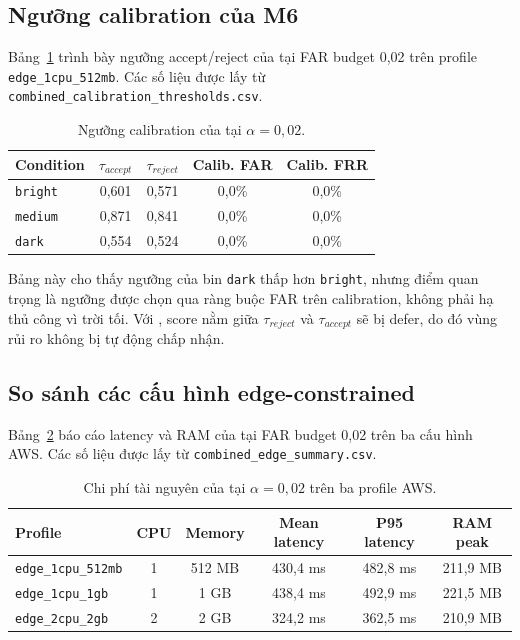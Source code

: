 \subsection{Ngưỡng calibration của M6}

Bảng~\ref{tab:thresholds} trình bày ngưỡng accept/reject của  tại FAR budget 0,02 trên profile \texttt{edge\_1cpu\_512mb}. Các số liệu được lấy từ \texttt{combined\_calibration\_thresholds.csv}.

\begin{table}[!htbp]
\centering
\caption{Ngưỡng calibration của  tại $\alpha=0{,}02$.}
\label{tab:thresholds}
\begin{tabular}{lcccc}
\toprule
\textbf{Condition} & \textbf{$\tau_{accept}$} & \textbf{$\tau_{reject}$} & \textbf{Calib. FAR} & \textbf{Calib. FRR} \\
\midrule
\texttt{bright} & 0,601 & 0,571 & 0,0\% & 0,0\% \\
\texttt{medium} & 0,871 & 0,841 & 0,0\% & 0,0\% \\
\texttt{dark} & 0,554 & 0,524 & 0,0\% & 0,0\% \\
\bottomrule
\end{tabular}
\end{table}

Bảng này cho thấy ngưỡng của bin \texttt{dark} thấp hơn \texttt{bright}, nhưng điểm quan trọng là ngưỡng được chọn qua ràng buộc FAR trên calibration, không phải hạ thủ công vì trời tối. Với , score nằm giữa $\tau_{reject}$ và $\tau_{accept}$ sẽ bị defer, do đó vùng rủi ro không bị tự động chấp nhận.

\subsection{So sánh các cấu hình edge-constrained}

Bảng~\ref{tab:profile_results} báo cáo latency và RAM của  tại FAR budget 0,02 trên ba cấu hình AWS. Các số liệu được lấy từ \texttt{combined\_edge\_summary.csv}.

\begin{table}[!htbp]
\centering
\caption{Chi phí tài nguyên của  tại $\alpha=0{,}02$ trên ba profile AWS.}
\label{tab:profile_results}
\begin{tabular}{lccccc}
\toprule
\textbf{Profile} & \textbf{CPU} & \textbf{Memory} & \textbf{Mean latency} & \textbf{P95 latency} & \textbf{RAM peak} \\
\midrule
\texttt{edge\_1cpu\_512mb} & 1 & 512 MB & 430,4 ms & 482,8 ms & 211,9 MB \\
\texttt{edge\_1cpu\_1gb}   & 1 & 1 GB   & 438,4 ms & 492,9 ms & 221,5 MB \\
\texttt{edge\_2cpu\_2gb}   & 2 & 2 GB   & 324,2 ms & 362,5 ms & 210,9 MB \\
\bottomrule
\end{tabular}
\end{table}

